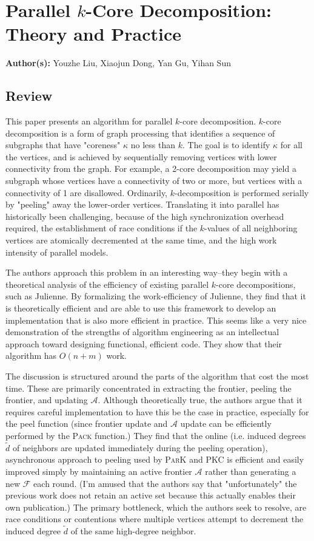 \section{Parallel $k$-Core Decomposition: Theory and Practice}

\textbf{Author(s):} Youzhe Liu, Xiaojun Dong, Yan Gu, Yihan Sun

\subsection{Review}

This paper presents an algorithm for parallel $k$-core decomposition. $k$-core decomposition is a form of graph processing that identifies a sequence of subgraphs that have "coreness" $\kappa$ no less than $k$. The goal is to identify $\kappa$ for all the vertices, and is achieved by sequentially removing vertices with lower connectivity from the graph. For example, a 2-core decomposition may yield a subgraph whose vertices have a connectivity of two or more, but vertices with a connectivity of 1 are disallowed. Ordinarily, $k$-decomposition is performed serially by "peeling" away the lower-order vertices. Translating it into parallel has historically been challenging, because of the high synchronization overhead required, the establishment of race conditions if the $k$-values of all neighboring vertices are atomically decremented at the same time, and the high work intensity of parallel models. 

The authors approach this problem in an interesting way--they begin with a theoretical analysis of the efficiency of existing parallel $k$-core decompositions, such as Julienne. By formalizing the work-efficiency of Julienne, they find that it is theoretically efficient and are able to use this framework to develop an implementation that is also more efficient in practice. This seems like a very nice demonstration of the strengths of algorithm engineering as an intellectual approach toward designing functional, efficient code. They show that their algorithm has $O(n+m)$ work.

The discussion is structured around the parts of the algorithm that cost the most time. These are primarily concentrated in extracting the frontier, peeling the frontier, and updating $\mathcal{A}$. Although theoretically true, the authors argue that it requires careful implementation to have this be the case in practice, especially for the peel function (since frontier update and $\mathcal{A}$ update can be efficiently performed by the \textsc{Pack} function.) They find that the online (i.e. induced degrees $\tilde{d}$ of neighbors are updated immediately during the peeling operation), asynchronous approach to peeling used by \textsc{ParK} and \textsc{PKC} is efficient and easily improved simply by maintaining an active frontier $\mathcal{A}$ rather than generating a new $\mathcal{F}$ each round. (I'm amused that the authors say that "unfortunately" the previous work does not retain an active set because this actually enables their own publication.) The primary bottleneck, which the authors seek to resolve, are race conditions or contentions where multiple vertices attempt to decrement the induced degree $\tilde{d}$ of the same high-degree neighbor.

